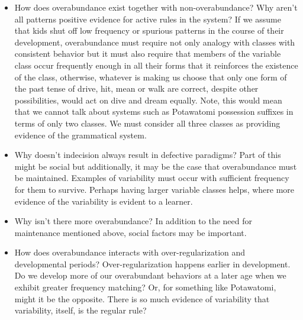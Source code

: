 \begin{itemize}
\item How does overabundance exist together with non-overabundance?
  Why aren't all patterns positive evidence for active rules in the
  system? If we assume that kids shut off low frequency or spurious
  patterns in the course of their development, overabundance must
  require not only analogy with classes with consistent behavior but
  it must also require that members of the variable class occur
  frequently enough in all their forms that it reinforces the
  existence of the class, otherwise, whatever is making us choose that
  only one form of the past tense of {\sc drive}, {\sc hit}, {\sc
    mean} or {\sc walk} are correct, despite other possibilities,
  would act on {\sc dive} and {\sc dream} equally.  Note, this would
  mean that we cannot talk about systems such as Potawatomi possession
  suffixes in terms of only two classes. We must consider all three
  classes as providing evidence of the grammatical system.
\item Why doesn't indecision always result in defective paradigms?
  Part of this might be social but additionally, it may be the case
  that overabundance must be maintained. Examples of variability must
  occur with sufficient frequency for them to survive. Perhaps having
  larger variable classes helps, where more evidence of the
  variability is evident to a learner.
\item Why isn't there more overabundance? In addition to the need for
  maintenance mentioned above, social factors may be
  important.
\item How does overabundance interacts with over-regularization and
  developmental periods? Over-regularization happens earlier in
  development. Do we develop more of our overabundant behaviors at a
  later age when we exhibit greater frequency matching? Or, for
  something like Potawatomi, might it be the opposite. There is so
  much evidence of variability that variability, itself, is the
  regular rule?
\end{itemize}

